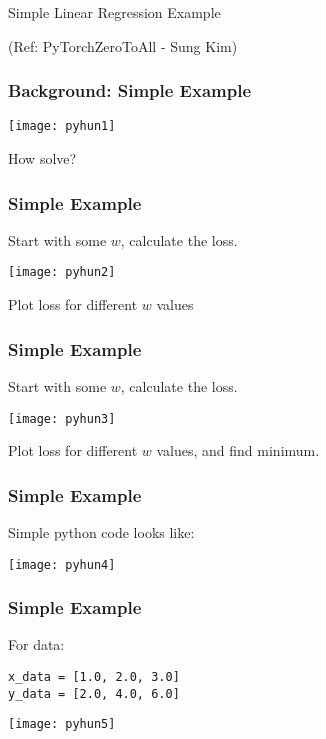 \begin{frame}
  \begin{center}
    {\Large Simple Linear Regression Example}
    
\tiny{(Ref: PyTorchZeroToAll  - Sung Kim)}
  \end{center}
\end{frame}

\begin{frame}[fragile] \frametitle{Background: Simple Example}
\begin{center}
\texttt{[image: pyhun1]}
\end{center}

How solve?


\end{frame}

\begin{frame}[fragile] \frametitle{Simple Example}
 Start with some $w$, calculate the loss.
\begin{center}
\texttt{[image: pyhun2]}
\end{center}

Plot loss for different $w$ values


\end{frame}


\begin{frame}[fragile] \frametitle{Simple Example}
 Start with some $w$, calculate the loss.
\begin{center}
\texttt{[image: pyhun3]}
\end{center}

Plot loss for different $w$ values, and find minimum.

\end{frame}


\begin{frame}[fragile] \frametitle{Simple Example}
Simple python code looks like:
\begin{center}
\texttt{[image: pyhun4]}
\end{center}


\end{frame}

\begin{frame}[fragile] \frametitle{Simple Example}
For data:
\begin{lstlisting}
x_data = [1.0, 2.0, 3.0]
y_data = [2.0, 4.0, 6.0]
\end{lstlisting}

\begin{center}
\texttt{[image: pyhun5]}
\end{center}


\end{frame}

